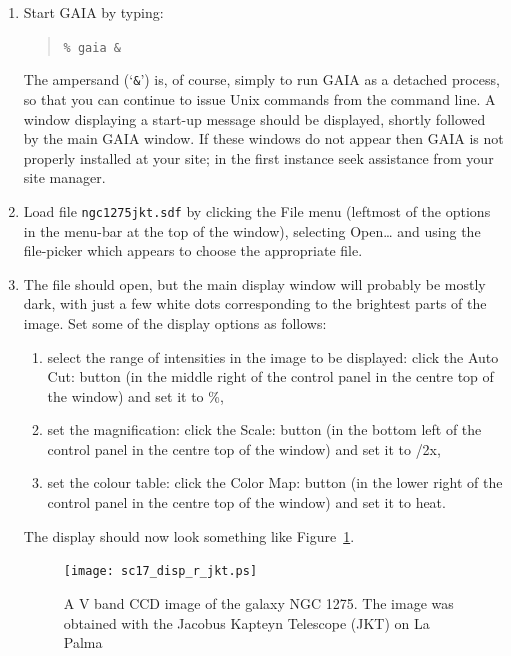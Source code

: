 \documentclass[twoside,11pt]{article}
\begin{document}
\begin{enumerate}

  \item Start GAIA by typing:

  \begin{quote}
   {\tt \%  gaia \&}
  \end{quote}

   The ampersand (`{\tt \&}') is, of course, simply to run GAIA as a
   detached process, so that you can continue to issue Unix commands
   from the command line.  A window displaying a start-up message should
   be displayed, shortly followed by the main GAIA window.  If these
   windows do not appear then GAIA is not properly installed at your site;
   in the first instance seek assistance from your site manager.

  \item Load file {\tt ngc1275jkt.sdf} by clicking the {\sf File} menu
   (leftmost of the options in the menu-bar at the top of the window),
   selecting {\sf Open\ldots} and using the file-picker which appears to
   choose the appropriate file.

  \item The file should open, but the main display window will probably
   be mostly dark, with just a few white dots corresponding to the
   brightest parts of the image.  Set some of the display options as
   follows:

  \begin{enumerate}

    \item select the range of intensities in the image to be displayed:
     click the {\sf Auto Cut:} button (in the middle right of the control
     panel in the centre top of the window) and set it to {\%},

    \item set the magnification: click the {\sf Scale:} button (in the
     bottom left of the control panel in the centre top of the window) and
     set it to {/2x},

    \item set the colour table: click the {\sf Color Map:} button (in the
     lower right of the control panel in the centre top of the window) and
     set it to {\sf heat}.

  \end{enumerate}

   The display should now look something like Figure~\ref{DISP_R_JKT}.

  \begin{figure}[htbp]
     \centering
     \texttt{[image: sc17\_disp\_r\_jkt.ps]}
     \begin{quote}
     \caption[A V band CCD image of NGC 1275]
      {A V band CCD image of the galaxy NGC 1275.  The image was obtained
      with the Jacobus Kapteyn Telescope (JKT) on La Palma
     \label{DISP_R_JKT} }
     \end{quote}
  \end{figure}


\end{enumerate}
\end{document}
